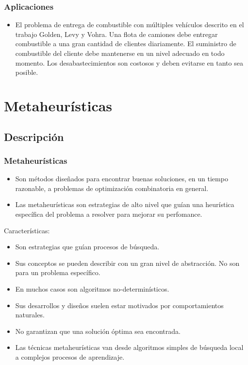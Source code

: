 \documentclass{beamer}
\begin{document}


\begin{frame}
\frametitle{Aplicaciones}

\begin{itemize}
	\item El problema de entrega de combustible con múltiples vehículos descrito en el trabajo Golden, Levy y Vohra. Una flota de camiones debe entregar combustible a una gran cantidad de clientes diariamente. El suministro de combustible del cliente debe mantenerse en un nivel adecuado en todo momento. Los desabastecimientos son costosos y deben evitarse en tanto sea posible.
\end{itemize}

\end{frame}


\section{Metaheurísticas}
\subsection{Descripción}

\begin{frame}
\frametitle{Metaheurísticas}

\begin{itemize}
    \item Son métodos diseñados para encontrar buenas soluciones, en un tiempo razonable, a problemas de optimización combinatoria en general.
    \pause
    \item Las metaheurísticas son estrategias de alto nivel que guían una heurística específica del problema a resolver para mejorar su perfomance.
    \pause
\end{itemize}

Caracter\'isticas:

\begin{itemize}
    \item Son estrategias que gu\'ian procesos de búsqueda.
    \pause
    \item Sus conceptos se pueden describir con un gran nivel de abstracción. No son para un problema específico.
    \pause
    \item En muchos casos son algoritmos no-determin\'isticos.
    \pause
    \item Sus desarrollos y diseños suelen estar motivados por comportamientos naturales.
    \pause
    \item No garantizan que una soluci\'on \'optima sea encontrada.
    \pause
    \item Las t\'ecnicas metaheur\'isticas van desde algoritmos simples de b\'usqueda local a complejos procesos de aprendizaje.
\end{itemize}

\end{frame}
\end{document}
